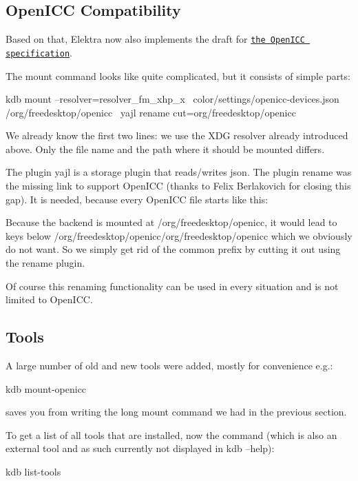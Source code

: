 \subsection*{Open\+I\+CC Compatibility}

Based on that, Elektra now also implements the draft for \href{https://www.openicc.info/index.php%3Ftitle=OpenICC_Configuration_0.1.html}{\tt the Open\+I\+CC specification}.

The mount command looks like quite complicated, but it consists of simple parts\+: \begin{DoxyVerb}kdb mount --resolver=resolver_fm_xhp_x \
  color/settings/openicc-devices.json /org/freedesktop/openicc \
  yajl rename cut=org/freedesktop/openicc
\end{DoxyVerb}


We already know the first two lines\+: we use the X\+DG resolver already introduced above. Only the file name and the path where it should be mounted differs.

The plugin yajl is a storage plugin that reads/writes json. The plugin rename was the missing link to support Open\+I\+CC (thanks to Felix Berlakovich for closing this gap). It is needed, because every Open\+I\+CC file starts like this\+: \begin{DoxyVerb}{ "org": { "freedesktop": { "openicc": {
\end{DoxyVerb}


Because the backend is mounted at /org/freedesktop/openicc, it would lead to keys below /org/freedesktop/openicc/org/freedesktop/openicc which we obviously do not want. So we simply get rid of the common prefix by cutting it out using the rename plugin.

Of course this renaming functionality can be used in every situation and is not limited to Open\+I\+CC.

\subsection*{Tools}

A large number of old and new tools were added, mostly for convenience e.\+g.\+: \begin{DoxyVerb}kdb mount-openicc
\end{DoxyVerb}


saves you from writing the long mount command we had in the previous section.

To get a list of all tools that are installed, now the command (which is also an external tool and as such currently not displayed in kdb --help)\+: \begin{DoxyVerb}kdb list-tools
\end{DoxyVerb}


